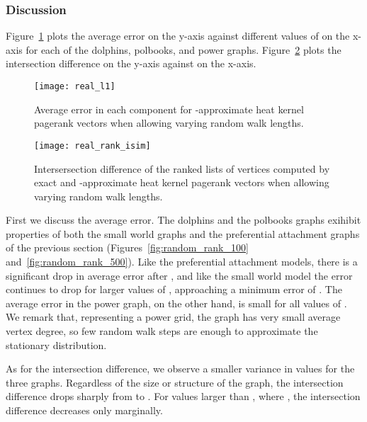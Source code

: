 \documentclass[runningheads,a4paper]{llncs}
\begin{document}
\subsubsection{Discussion}
Figure~\ref{fig:real_l1} plots the average  error on the y-axis against
different values of  on the x-axis for each of the dolphins, polbooks, and
power graphs.  Figure~\ref{fig:real_rank_isim} plots the intersection difference
on the y-axis against  on the x-axis.

\begin{figure}
\centering
\texttt{[image: real\_l1]}
\caption{Average error in each component for -approximate heat kernel
pagerank vectors when allowing varying random walk lengths.}
\label{fig:real_l1}
\end{figure}

\begin{figure}
\centering
\texttt{[image: real\_rank\_isim]}
\caption{Intersersection difference of the ranked lists of vertices computed by
exact and -approximate heat kernel pagerank vectors when allowing
varying random walk lengths.}
\label{fig:real_rank_isim}
\end{figure}

First we discuss the average  error.  The dolphins and the polbooks graphs
exihibit properties of both the small world graphs and the preferential
attachment graphs of the previous section (Figures~\ref{fig:random_rank_100}
and~\ref{fig:random_rank_500}).  Like the preferential attachment models, there
is a significant drop in average  error after , and like the small
world model the error continues to drop for larger values of , approaching a
minimum error of .  The average  error in the power graph,
on the other hand,  is small for all values of .  We remark that,
representing a power grid, the graph has very small average vertex degree, so
few random walk steps are enough to approximate the stationary distribution.

As for the intersection difference, we observe a smaller variance in values for
the three graphs.  Regardless of the size or structure of the graph, the
intersection difference drops sharply from  to .  For values larger
than , where , the intersection
difference decreases only marginally.
\end{document}
